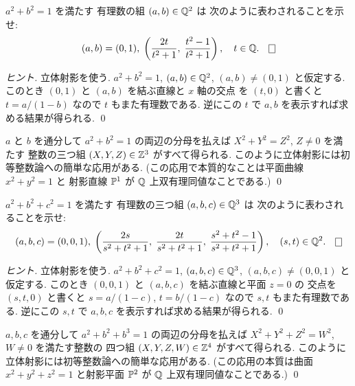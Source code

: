 \documentclass[12pt,twoside]{jarticle}
\begin{document}
\begin{question}
 $a^2+b^2=1$ を満たす 有理数の組 $(a,b)\in\Q^2$ は
 次のように表わされることを示せ:
 \begin{equation*}
  (a,b) = (0,1),\; \left(\frac{2t}{t^2+1},\;\frac{t^2-1}{t^2+1}\right),
  \quad t\in\Q.
  \qed
 \end{equation*}
\end{question}

\begin{proof}[ヒント]
 立体射影を使う. 
 $a^2+b^2=1$, $(a,b)\in\Q^2$, $(a,b)\ne(0,1)$ と仮定する.
 このとき $(0,1)$ と $(a,b)$ を結ぶ直線と $x$ 軸の交点
 を $(t,0)$ と書くと $t=a/(1-b)$ なので $t$ もまた有理数である.
 逆にこの $t$ で $a,b$ を表示すれば求める結果が得られる.
 \qed
\end{proof}

\begin{rem}
 $a$ と $b$ を通分して $a^2+b^2=1$ の両辺の分母を払えば %
 $X^2+Y^2=Z^2$, $Z\ne 0$ を満たす
 整数の三つ組 $(X,Y,Z)\in\Z^3$ がすべて得られる.
 このように立体射影には初等整数論への簡単な応用がある. 
 (この応用で本質的なことは平面曲線 $x^2+y^2=1$ と
 射影直線 $\P^1$ が $\Q$ 上双有理同値なことである.)
 \qed
\end{rem}

\begin{question}
 $a^2+b^2+c^2=1$ を満たす 有理数の三つ組 $(a,b,c)\in\Q^3$ は
 次のように表わされることを示せ:
 \begin{equation*}
  (a,b,c) 
  = (0,0,1),\; 
    \left(
     \frac{2s}{s^2+t^2+1},\;
     \frac{2t}{s^2+t^2+1},\;
     \frac{s^2+t^2-1}{s^2+t^2+1}
    \right),
  \quad (s,t)\in\Q^2.
  \qed
 \end{equation*}
\end{question}

\begin{proof}[ヒント]
 立体射影を使う. 
 $a^2+b^2+c^2=1$, $(a,b,c)\in\Q^3$, $(a,b,c)\ne(0,0,1)$ と仮定する.
 このとき $(0,0,1)$ と $(a,b,c)$ を結ぶ直線と平面 $z=0$ の
 交点を $(s,t,0)$ と書くと $s=a/(1-c)$, $t=b/(1-c)$ 
 なので $s,t$ もまた有理数である.
 逆にこの $s,t$ で $a,b,c$ を表示すれば求める結果が得られる.
 \qed
\end{proof}

\begin{rem}
 $a,b,c$ を通分して $a^2+b^2+b^3=1$ の両辺の分母を払えば %
 $X^2+Y^2+Z^2=W^2$, $W\ne 0$ を満たす整数の
 四つ組 $(X,Y,Z,W)\in\Z^4$ がすべて得られる.
 このように立体射影には初等整数論への簡単な応用がある. 
 (この応用の本質は曲面 $x^2+y^2+z^2=1$ と射影平面 $\P^2$ 
 が $\Q$ 上双有理同値なことである.)
 \qed
\end{rem}
\end{document}
